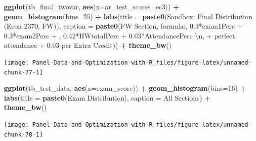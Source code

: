 \documentclass[
]{book}
\newenvironment{Shaded}{\begin{snugshade}}{\end{snugshade}}
\newcommand{\CharTok}[1]{\textcolor[rgb]{0.31,0.60,0.02}{#1}}
\newcommand{\DataTypeTok}[1]{\textcolor[rgb]{0.13,0.29,0.53}{#1}}
\newcommand{\DecValTok}[1]{\textcolor[rgb]{0.00,0.00,0.81}{#1}}
\newcommand{\KeywordTok}[1]{\textcolor[rgb]{0.13,0.29,0.53}{\textbf{#1}}}
\newcommand{\NormalTok}[1]{#1}
\newcommand{\OperatorTok}[1]{\textcolor[rgb]{0.81,0.36,0.00}{\textbf{#1}}}
\newcommand{\StringTok}[1]{\textcolor[rgb]{0.31,0.60,0.02}{#1}}
\begin{document}
\begin{Shaded}
\begin{Highlighting}[]
\KeywordTok{ggplot}\NormalTok{(tb\_final\_twovar, }\KeywordTok{aes}\NormalTok{(}\DataTypeTok{x=}\NormalTok{ar\_test\_scores\_ec3)) }\OperatorTok{+}
\StringTok{  }\KeywordTok{geom\_histogram}\NormalTok{(}\DataTypeTok{bins=}\DecValTok{25}\NormalTok{) }\OperatorTok{+}
\StringTok{  }\KeywordTok{labs}\NormalTok{(}\DataTypeTok{title =} \KeywordTok{paste0}\NormalTok{(}\StringTok{\textquotesingle{}Sandbox: Final Distribution (Econ 2370, FW)\textquotesingle{}}\NormalTok{),}
       \DataTypeTok{caption =} \KeywordTok{paste0}\NormalTok{(}\StringTok{\textquotesingle{}FW Section, formula:\textquotesingle{}}\NormalTok{,}
                        \StringTok{\textquotesingle{}0.3*exam1Perc + 0.3*exam2Perc + \textquotesingle{}}\NormalTok{,}
                        \StringTok{\textquotesingle{}0.42*HWtotalPerc + 0.03*AttendancePerc }\CharTok{\textbackslash{}n}\StringTok{\textquotesingle{}}\NormalTok{,}
                        \StringTok{\textquotesingle{}+ perfect attendance + 0.03 per Extra Credit\textquotesingle{}}\NormalTok{)) }\OperatorTok{+}
\StringTok{  }\KeywordTok{theme\_bw}\NormalTok{()}
\end{Highlighting}
\end{Shaded}

\begin{center}\texttt{[image: Panel-Data-and-Optimization-with-R\_files/figure-latex/unnamed-chunk-77-1]} \end{center}

\begin{Shaded}
\begin{Highlighting}[]
\KeywordTok{ggplot}\NormalTok{(tb\_test\_data, }\KeywordTok{aes}\NormalTok{(}\DataTypeTok{x=}\NormalTok{exam\_score)) }\OperatorTok{+}
\StringTok{  }\KeywordTok{geom\_histogram}\NormalTok{(}\DataTypeTok{bins=}\DecValTok{16}\NormalTok{) }\OperatorTok{+}
\StringTok{  }\KeywordTok{labs}\NormalTok{(}\DataTypeTok{title =} \KeywordTok{paste0}\NormalTok{(}\StringTok{\textquotesingle{}Exam Distribution\textquotesingle{}}\NormalTok{),}
       \DataTypeTok{caption =} \StringTok{\textquotesingle{}All Sections\textquotesingle{}}\NormalTok{) }\OperatorTok{+}
\StringTok{  }\KeywordTok{theme\_bw}\NormalTok{()}
\end{Highlighting}
\end{Shaded}

\begin{center}\texttt{[image: Panel-Data-and-Optimization-with-R\_files/figure-latex/unnamed-chunk-78-1]} \end{center}
\end{document}
